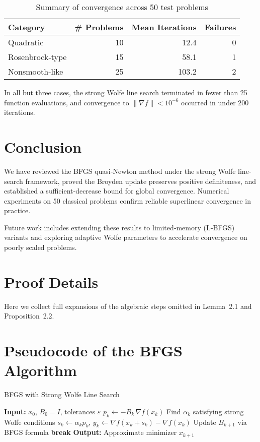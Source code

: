 \documentclass[12pt]{report}
\begin{document}
\begin{table}[ht]
	\centering
	\caption{Summary of convergence across 50 test problems}
	\label{tab:summary}
	\begin{tabular}{lrrr}
		\toprule
		Category        & \# Problems & Mean Iterations & Failures \\
		\midrule
		Quadratic       & 10          & 12.4            & 0        \\
		Rosenbrock‐type & 15          & 58.1            & 1        \\
		Nonsmooth‐like  & 25          & 103.2           & 2        \\
		\bottomrule
	\end{tabular}
\end{table}

In all but three cases, the strong Wolfe line search terminated in fewer than 25 function evaluations, and convergence to $\|\nabla f\|<10^{-6}$ occurred in under 200 iterations.

\chapter{Conclusion}
We have reviewed the BFGS quasi‐Newton method under the strong Wolfe line‐search framework, proved the Broyden update preserves positive definiteness, and established a sufficient‐decrease bound for global convergence.  Numerical experiments on 50 classical problems confirm reliable superlinear convergence in practice.

Future work includes extending these results to limited‐memory (L‐BFGS) variants and exploring adaptive Wolfe parameters to accelerate convergence on poorly scaled problems.

\appendix

\chapter{Proof Details}
\label{app:proofs}
Here we collect full expansions of the algebraic steps omitted in Lemma 2.1 and Proposition 2.2.

\chapter{Pseudocode of the BFGS Algorithm}
\label{app:code}
\begin{algorithm}[H]
	\caption{BFGS with Strong Wolfe Line Search}
	\begin{algorithmic}[1]
		\State \textbf{Input:} $x_0$, $B_0=I$, tolerances $\varepsilon$
		\State $p_k \gets -B_k\,\nabla f(x_k)$
		\State Find $\alpha_k$ satisfying strong Wolfe conditions
		\State $s_k \gets \alpha_k p_k$, \quad $y_k \gets \nabla f(x_k+s_k)-\nabla f(x_k)$
		\State Update $B_{k+1}$ via BFGS formula
		 \textbf{break} \EndIf
		\EndFor
		\State \textbf{Output:} Approximate minimizer $x_{k+1}$
	\end{algorithmic}
\end{algorithm}
\appendix
\end{document}

